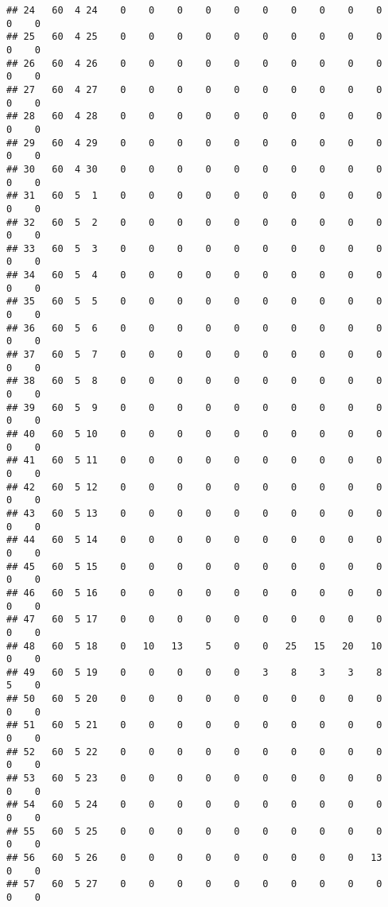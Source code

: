 \documentclass[]{article}
\begin{document}
\begin{verbatim}
## 24   60  4 24    0    0    0    0    0    0    0    0    0    0    0    0
## 25   60  4 25    0    0    0    0    0    0    0    0    0    0    0    0
## 26   60  4 26    0    0    0    0    0    0    0    0    0    0    0    0
## 27   60  4 27    0    0    0    0    0    0    0    0    0    0    0    0
## 28   60  4 28    0    0    0    0    0    0    0    0    0    0    0    0
## 29   60  4 29    0    0    0    0    0    0    0    0    0    0    0    0
## 30   60  4 30    0    0    0    0    0    0    0    0    0    0    0    0
## 31   60  5  1    0    0    0    0    0    0    0    0    0    0    0    0
## 32   60  5  2    0    0    0    0    0    0    0    0    0    0    0    0
## 33   60  5  3    0    0    0    0    0    0    0    0    0    0    0    0
## 34   60  5  4    0    0    0    0    0    0    0    0    0    0    0    0
## 35   60  5  5    0    0    0    0    0    0    0    0    0    0    0    0
## 36   60  5  6    0    0    0    0    0    0    0    0    0    0    0    0
## 37   60  5  7    0    0    0    0    0    0    0    0    0    0    0    0
## 38   60  5  8    0    0    0    0    0    0    0    0    0    0    0    0
## 39   60  5  9    0    0    0    0    0    0    0    0    0    0    0    0
## 40   60  5 10    0    0    0    0    0    0    0    0    0    0    0    0
## 41   60  5 11    0    0    0    0    0    0    0    0    0    0    0    0
## 42   60  5 12    0    0    0    0    0    0    0    0    0    0    0    0
## 43   60  5 13    0    0    0    0    0    0    0    0    0    0    0    0
## 44   60  5 14    0    0    0    0    0    0    0    0    0    0    0    0
## 45   60  5 15    0    0    0    0    0    0    0    0    0    0    0    0
## 46   60  5 16    0    0    0    0    0    0    0    0    0    0    0    0
## 47   60  5 17    0    0    0    0    0    0    0    0    0    0    0    0
## 48   60  5 18    0   10   13    5    0    0   25   15   20   10    0    0
## 49   60  5 19    0    0    0    0    0    3    8    3    3    8    5    0
## 50   60  5 20    0    0    0    0    0    0    0    0    0    0    0    0
## 51   60  5 21    0    0    0    0    0    0    0    0    0    0    0    0
## 52   60  5 22    0    0    0    0    0    0    0    0    0    0    0    0
## 53   60  5 23    0    0    0    0    0    0    0    0    0    0    0    0
## 54   60  5 24    0    0    0    0    0    0    0    0    0    0    0    0
## 55   60  5 25    0    0    0    0    0    0    0    0    0    0    0    0
## 56   60  5 26    0    0    0    0    0    0    0    0    0   13    0    0
## 57   60  5 27    0    0    0    0    0    0    0    0    0    0    0    0

\end{verbatim}
\end{document}
